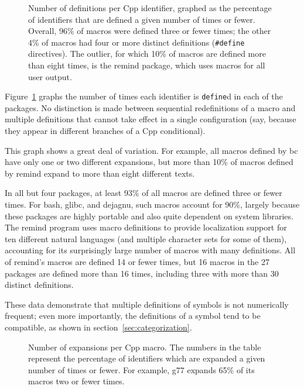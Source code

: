 \documentclass[11pt]{article}
\def\numpackages{27}
\begin{document}
\begin{figure}
\centerline{}
\caption{Number of definitions per Cpp identifier, graphed as
  the percentage of identifiers that are defined a given number of times
  or fewer.  Overall, 96\% of macros were defined three or
  fewer times; the other 4\% of macros had four or more distinct
  definitions ({\tt \#define} directives).  The outlier, for which 10\% of
  macros are defined more than eight times, is the remind
  package, which uses macros for all user output.}
\label{fig:freq-def}
\end{figure}

Figure~\ref{fig:freq-def} graphs the number of times each identifier is
{\tt define}d in each of the packages.  No distinction is made between
sequential redefinitions of a macro and multiple definitions that cannot
take effect in a single configuration (say, because they appear in
different branches of a Cpp conditional).

This graph shows a great deal of variation.  For example, all macros
defined by bc have only one or two different expansions, but more than 10\%
of macros defined by remind expand to more than eight different texts.

In all but four packages, at least 93\% of all macros are defined three or
fewer times.  For bash, glibc, and dejagnu, such macros account for 90\%,
largely because these packages are highly portable and also quite dependent
on system libraries.  The remind program uses macro definitions to provide
localization support for ten different natural languages (and multiple
character sets for some of them), accounting for its surprisingly large
number of macros with many definitions.  All of remind's macros are defined
14 or fewer times, but 16 macros in the {\numpackages} packages are defined
more than 16 times, including three with more than 30 distinct definitions.

These data demonstrate that multiple definitions of symbols is not
numerically frequent; even more importantly, the definitions of a symbol
tend to be compatible, as shown in section~\ref{sec:categorization}.


\begin{figure}
\centerline{}
\caption{Number of expansions per Cpp macro.  The numbers in the
  table represent the percentage of identifiers which are expanded a given
  number of times or fewer.  For example, g77 expands 65\% of its
  macros two or fewer times.}
\label{fig:freq-use}
\end{figure}
\end{document}
